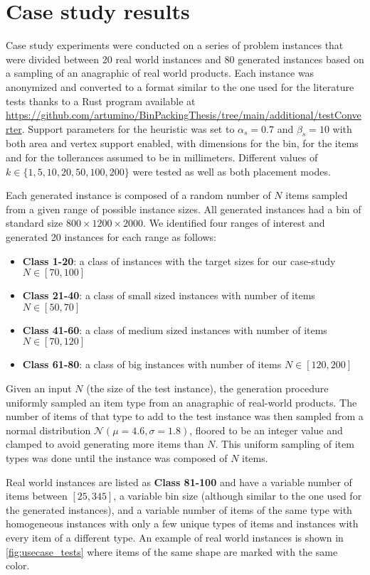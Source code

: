 \section{Case study results}
Case study experiments were conducted on a series of problem instances that were divided between 20 real world instances and 80 generated instances based on a sampling of an anagraphic of real world products.
Each instance was anonymized and converted to a format similar to the one used for the literature tests thanks to a Rust program available at \url{https://github.com/artumino/BinPackingThesis/tree/main/additional/testConverter}.
Support parameters for the heuristic was set to $\alpha_s = 0.7$ and $\beta_s = 10$ with both area and vertex support enabled, with dimensions for the bin, for the items and for the tollerances assumed to be in millimeters.
Different values of $k \in \{1, 5, 10, 20, 50, 100, 200\}$ were tested as well as both placement modes.

Each generated instance is composed of a random number of $N$ items sampled from a given range of possible instance sizes. All generated instances had a bin of standard size $800 \times 1200 \times 2000$.
We identified four ranges of interest and generated 20 instances for each range as follows:
\begin{itemize}
    \item \textbf{Class 1-20}: a class of instances with the target sizes for our case-study $N \in [70,100]$
    \item \textbf{Class 21-40}: a class of small sized instances with number of items $N \in [50,70]$
    \item \textbf{Class 41-60}: a class of medium sized instances with number of items $N \in [70,120]$
    \item \textbf{Class 61-80}: a class of big instances with number of items $N \in [120,200]$
\end{itemize}

Given an input $N$ (the size of the test instance), the generation procedure uniformly sampled an item type from an anagraphic of real-world products. The number of items of that type to add to the test instance was then sampled from a normal distribution $\mathcal{N}(\mu = 4.6, \sigma = 1.8)$, floored to be an integer value and clamped to avoid generating more items than $N$. 
This uniform sampling of item types was done until the instance was composed of $N$ items.

Real world instances are listed as \textbf{Class 81-100} and have a variable number of items between $[25, 345]$, a variable bin size (although similar to the one used for the generated instances), and a variable number of items of the same type with homogeneous instances with only a few unique types of items and instances with every item of a different type.
An example of real world instances is shown in \cref{fig:usecase_tests} where items of the same shape are marked with the same color.

